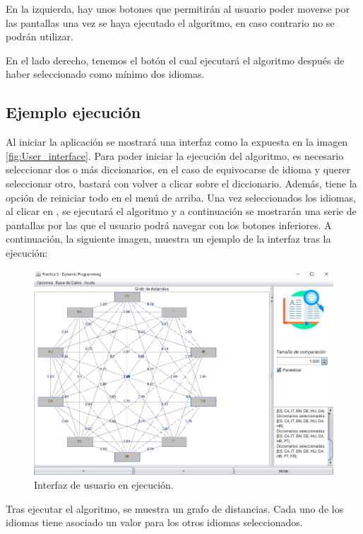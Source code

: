 En la izquierda, hay unos botones que permitirán al usuario poder moverse por las pantallas una vez se haya ejecutado el algoritmo, en caso contrario no se podrán utilizar. \bigskip

En el lado derecho, tenemos el botón  el cual ejecutará el algoritmo después de haber seleccionado como mínimo dos idiomas. 

\subsection{Ejemplo ejecución}

Al iniciar la aplicación se mostrará una interfaz como la expuesta en la imagen \ref{fig:User_interface}. Para poder iniciar la ejecución del algoritmo, es necesario seleccionar dos o más diccionarios, en el caso de equivocarse de idioma y querer seleccionar otro, bastará con volver a clicar sobre el diccionario. Además, tiene la opción de reiniciar todo en el menú de arriba. Una vez seleccionados los idiomas, al clicar en , se ejecutará el algoritmo y a continuación se mostrarán una serie de pantallas por las que el usuario podrá navegar con los botones inferiores. A continuación, la siguiente imagen, muestra un ejemplo de la interfaz tras la ejecución:

\begin{figure}[!h]
    \centering
    \includegraphics[width=\linewidth]{Usage/img/ejecucion.png}
    \caption{Interfaz de usuario en ejecución.}
    \label{fig:Ejemplo ejecución}
\end{figure}

Tras ejecutar el algoritmo, se muestra un grafo de distancias. Cada uno de los idiomas tiene asociado un valor  para los otros idiomas seleccionados. \bigskip

